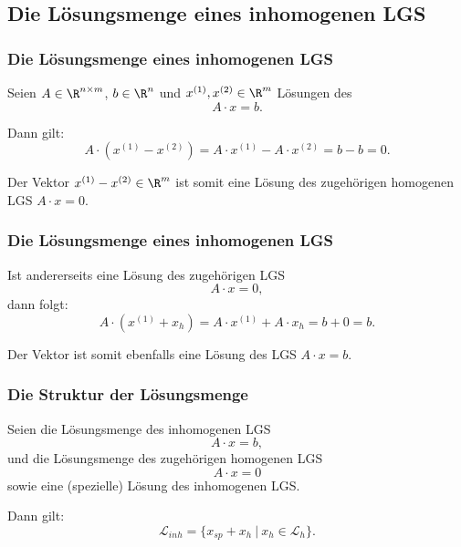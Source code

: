 \subsection{Die Lösungsmenge eines inhomogenen LGS}
\makeSectionDividerPage
%
%
\begin{frame}\frametitle{Die Lösungsmenge eines inhomogenen LGS}

	Seien $A\in\R^{n\times m}$, $b\in \R^n$ und $x^{(1)}, x^{(2)} \in \R^{m}$ Lösungen des 
	$$
		A\cdot x = b.
	$$
	
	\pause
	Dann gilt:
	$$
		A\cdot ( x^{(1)} - x^{(2)} ) 
		=  
		A\cdot x^{(1)} - A\cdot x^{(2)} 
		= 
		b - b 
		= 0.
	$$
	
	\pause
	\vspace{5mm}
	Der Vektor $x^{(1)} - x^{(2)}\in \R^{m}$  ist somit eine Lösung des zugehörigen homogenen LGS $A\cdot x=0$.
	
\end{frame}
%
%
\begin{frame}\frametitle{Die Lösungsmenge eines inhomogenen LGS}

	Ist andererseits  eine Lösung des zugehörigen  LGS 
	$$
		A\cdot x=0,
	$$ 
	dann folgt:
	$$
		A\cdot ( x^{(1)} + x_{h}) =  A\cdot x^{(1)} + A\cdot x_{h} = b + 0 = b.
	$$
	
	\pause
	\vspace{5mm}
	Der Vektor  ist somit ebenfalls eine Lösung des  LGS $A\cdot x=b$.
	
\end{frame}
%
%
\begin{frame}\frametitle{Die Struktur der Lösungsmenge}

	Seien  die Lösungsmenge des inhomogenen LGS 
	$$
		A\cdot x = b,
	$$
	und
	 die Lösungsmenge des zugehörigen homogenen LGS 
	$$
		A\cdot x=0
	$$ 
	sowie  eine (spezielle) Lösung des inhomogenen LGS.	
	
	\pause
	\vspace{5mm}
	Dann gilt:
	$$
 		\mathcal{L}_{inh} = \{ x_{sp} + x_h ~|~ x_h \in \mathcal{L}_{h} \}.
	$$
	
\end{frame}
%
%
